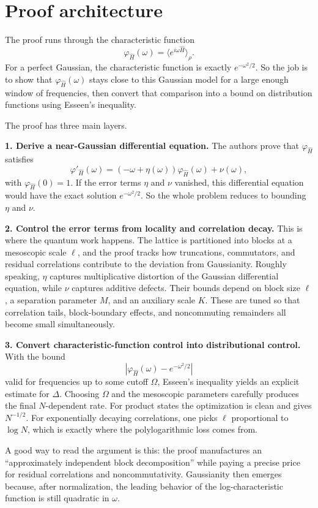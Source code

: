 \documentclass[11pt]{article}
\begin{document}
\section*{Proof architecture}
The proof runs through the characteristic function
\[
\varphi_{\widehat H}(\omega)=\langle e^{i\omega \widehat H}\rangle_\rho.
\]
For a perfect Gaussian, the characteristic function is exactly $e^{-\omega^2/2}$. So the job is to show that $\varphi_{\widehat H}(\omega)$ stays close to this Gaussian model for a large enough window of frequencies, then convert that comparison into a bound on distribution functions using Esseen's inequality.

The proof has three main layers.

\textbf{1. Derive a near-Gaussian differential equation.} The authors prove that $\varphi_{\widehat H}$ satisfies
\[
\varphi'_{\widehat H}(\omega) = (-\omega + \eta(\omega))\varphi_{\widehat H}(\omega) + \nu(\omega),
\]
with $\varphi_{\widehat H}(0)=1$. If the error terms $\eta$ and $\nu$ vanished, this differential equation would have the exact solution $e^{-\omega^2/2}$. So the whole problem reduces to bounding $\eta$ and $\nu$.

\textbf{2. Control the error terms from locality and correlation decay.} This is where the quantum work happens. The lattice is partitioned into blocks at a mesoscopic scale $\ell$, and the proof tracks how truncations, commutators, and residual correlations contribute to the deviation from Gaussianity. Roughly speaking, $\eta$ captures multiplicative distortion of the Gaussian differential equation, while $\nu$ captures additive defects. Their bounds depend on block size $\ell$, a separation parameter $M$, and an auxiliary scale $K$. These are tuned so that correlation tails, block-boundary effects, and noncommuting remainders all become small simultaneously.

\textbf{3. Convert characteristic-function control into distributional control.} With the bound
\[
|\varphi_{\widehat H}(\omega)-e^{-\omega^2/2}|
\]
valid for frequencies up to some cutoff $\Omega$, Esseen's inequality yields an explicit estimate for $\Delta$. Choosing $\Omega$ and the mesoscopic parameters carefully produces the final $N$-dependent rate. For product states the optimization is clean and gives $N^{-1/2}$. For exponentially decaying correlations, one picks $\ell$ proportional to $\log N$, which is exactly where the polylogarithmic loss comes from.

A good way to read the argument is this: the proof manufactures an ``approximately independent block decomposition'' while paying a precise price for residual correlations and noncommutativity. Gaussianity then emerges because, after normalization, the leading behavior of the log-characteristic function is still quadratic in $\omega$.
\end{document}
